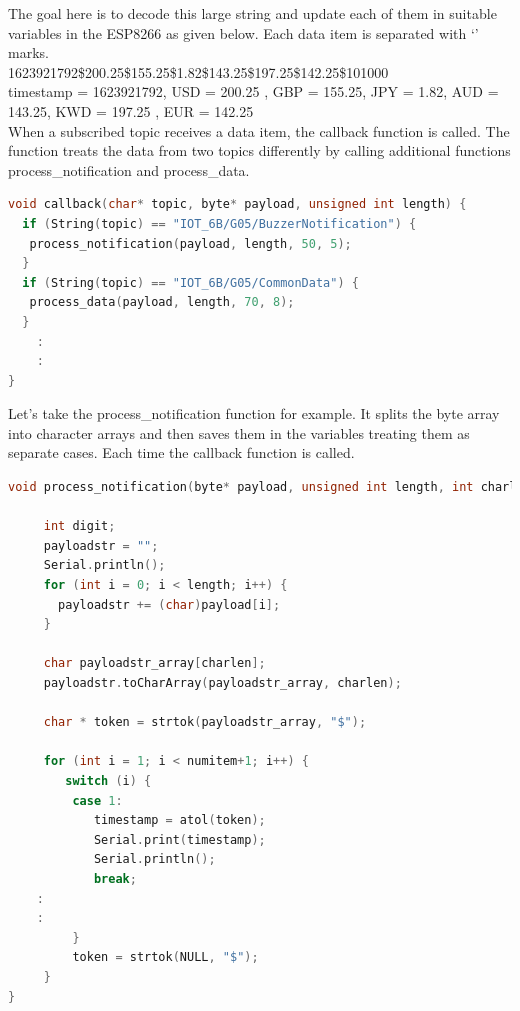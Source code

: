 The goal here is to decode this large string and update each of them in suitable variables in the ESP8266 as given below. Each data item is separated with ‘\textdollar’ marks.\\


1623921792\$200.25\$155.25\$1.82\$143.25\$197.25\$142.25\$101000\\


timestamp = 1623921792, USD = 200.25 , GBP = 155.25, JPY = 1.82, AUD = 143.25, KWD = 197.25 , EUR = 142.25\\

When a subscribed topic receives a data item, the callback function is called. The function treats the data from two topics differently by calling additional functions process\_notification and process\_data.\\

\begin{lstlisting}[language=C++]
void callback(char* topic, byte* payload, unsigned int length) {
  if (String(topic) == "IOT_6B/G05/BuzzerNotification") {
   process_notification(payload, length, 50, 5);
  }
  if (String(topic) == "IOT_6B/G05/CommonData") {
   process_data(payload, length, 70, 8);
  }
	:
	:
}
\end{lstlisting}

\vspace{\baselineskip}
Let’s take the process\_notification function for example. It splits the byte array into character arrays and then saves them in the variables treating them as separate cases. Each time the callback function is called.\\

\begin{lstlisting}[language=C++]
void process_notification(byte* payload, unsigned int length, int charlen, int numitem) {

     int digit;
     payloadstr = "";
     Serial.println();
     for (int i = 0; i < length; i++) {
       payloadstr += (char)payload[i];
     }

     char payloadstr_array[charlen];
     payloadstr.toCharArray(payloadstr_array, charlen);

     char * token = strtok(payloadstr_array, "$");
   
     for (int i = 1; i < numitem+1; i++) {
        switch (i) {
         case 1:
            timestamp = atol(token);
            Serial.print(timestamp);
            Serial.println();
            break;
	:
	:
         }
         token = strtok(NULL, "$");
     }
}
\end{lstlisting}

